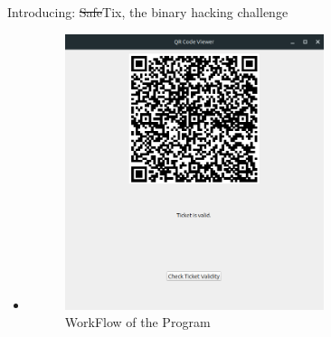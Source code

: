 \documentclass[final,dvipsnames]{beamer}
\newlength{\sepwidth}
\newlength{\colwidth}
\newcommand{\separatorcolumn}{\begin{column}{\sepwidth}\end{column}}
\begin{document}
\begin{frame}[t, fragile]
\begin{columns}[t]
\begin{column}{\colwidth}
\begin{block}{Introducing: \sout{Safe}Tix, the binary hacking challenge}
\begin{itemize}
			\item             \begin{figure}[h]
				\centering
				\includegraphics[width=0.8\textwidth]{figures/QR_Window.png}
				\caption{WorkFlow of the Program}
				\label{fig:WorkFlow1}
			\end{figure}
		\end{itemize}

	\end{block}

\end{column}

\separatorcolumn

\begin{column}{\colwidth}


\end{column}
\end{columns}
\end{frame}
\end{document}
